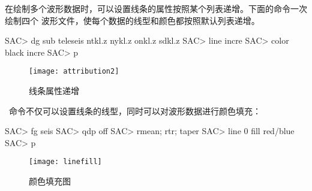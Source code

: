 在绘制多个波形数据时，可以设置线条的属性按照某个列表递增。下面的命令一次绘制四个
波形文件，使每个数据的线型和颜色都按照默认列表递增。
\begin{SACCode}
SAC> dg sub teleseis ntkl.z nykl.z onkl.z sdkl.z
SAC> line incre
SAC> color black incre
SAC> p
\end{SACCode}

\begin{figure}[H]
\centering
\texttt{[image: attribution2]}
\caption{线条属性递增}
\end{figure}

~命令不仅可以设置线条的线型，同时可以对波形数据进行颜色填充：
\begin{SACCode}
SAC> fg seis
SAC> qdp off
SAC> rmean; rtr; taper
SAC> line 0 fill red/blue
SAC> p
\end{SACCode}

\begin{figure}[H]
\centering
\texttt{[image: linefill]}
\caption{颜色填充图}
\end{figure}
